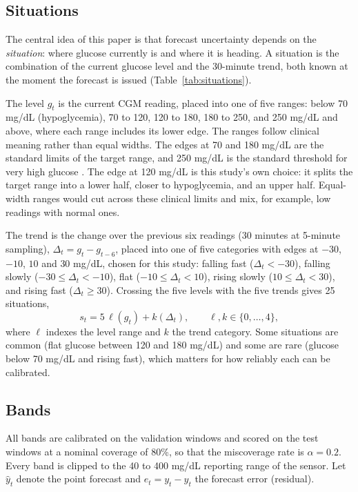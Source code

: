 \subsection{Situations}
\label{sec:situations}

The central idea of this paper is that forecast uncertainty depends on the \emph{situation}: where glucose currently is and where it is heading. A situation is the combination of the current glucose level and the 30-minute trend, both known at the moment the forecast is issued (Table~\ref{tab:situations}).

The level $g_t$ is the current CGM reading, placed into one of five ranges: below 70 mg/dL (hypoglycemia), 70 to 120, 120 to 180, 180 to 250, and 250 mg/dL and above, where each range includes its lower edge. The ranges follow clinical meaning rather than equal widths. The edges at 70 and 180 mg/dL are the standard limits of the target range, and 250 mg/dL is the standard threshold for very high glucose \parencite{battelino2019tir}. The edge at 120 mg/dL is this study's own choice: it splits the target range into a lower half, closer to hypoglycemia, and an upper half. Equal-width ranges would cut across these clinical limits and mix, for example, low readings with normal ones.

The trend is the change over the previous six readings (30 minutes at 5-minute sampling), $\Delta_t = g_t - g_{t-6}$, placed into one of five categories with edges at $-30$, $-10$, $10$ and $30$ mg/dL, chosen for this study: falling fast ($\Delta_t < -30$), falling slowly ($-30 \le \Delta_t < -10$), flat ($-10 \le \Delta_t < 10$), rising slowly ($10 \le \Delta_t < 30$), and rising fast ($\Delta_t \ge 30$). Crossing the five levels with the five trends gives 25 situations,
\begin{equation}
s_t = 5\,\ell(g_t) + k(\Delta_t), \qquad \ell, k \in \{0, \dots, 4\},
\end{equation}
where $\ell$ indexes the level range and $k$ the trend category. Some situations are common (flat glucose between 120 and 180 mg/dL) and some are rare (glucose below 70 mg/dL and rising fast), which matters for how reliably each can be calibrated.

\subsection{Bands}
\label{sec:bands}

All bands are calibrated on the validation windows and scored on the test windows at a nominal coverage of 80\%, so that the miscoverage rate is $\alpha = 0.2$. Every band is clipped to the 40 to 400 mg/dL reporting range of the sensor. Let $\hat{y}_t$ denote the point forecast and $e_t = y_t - \hat{y}_t$ the forecast error (residual).

